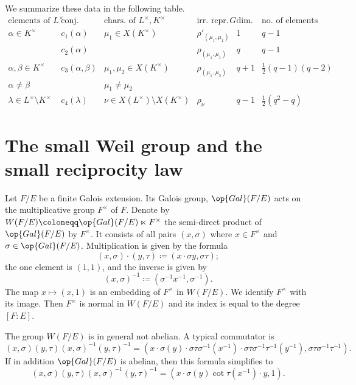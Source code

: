 \documentclass[../main.tex]{subfiles}
\begin{document}
We summarize these data in the following table.
\[\begin{array}{c|c|c|c|c|c}
	\text{elements of }L^\times & \text{conj. classes} & \text{chars. of }L^\times,K^\times & \text{irr. repr. of }G & \text{dim. of repr.} & \text{no. of elements} \\\hline\hline
	\alpha \in K^\times & c_1(\alpha) & \mu_1\in X(K^\times) & \rho'_{(\mu_1,\mu_1)} & 1 & q-1 \\
	& c_2(\alpha) & & \rho_{(\mu_1,\mu_1)} & q  & q-1 \\\hline
	\alpha,\beta\in K^\times & c_3(\alpha,\beta) & \mu_1,\mu_2\in X\left(K^\times\right) & \rho_{(\mu_1,\mu_2)} & q+1 & \frac12(q-1)(q-2) \\
	\alpha\ne\beta & & \mu_1\ne\mu_2 &&& \\\hline
	\lambda\in L^\times\setminus K^\times & c_4(\lambda) & \nu\in X\left(L^\times\right)\setminus X\left(K^\times\right) & \rho_\nu & q-1 & \frac12\left(q^2-q\right)
\end{array}\]

\section{The small Weil group and the small reciprocity law} \label{sec:weil-group}
Let $F/E$ be a finite Galois extension. Its Galois group, $\op{Gal}(F/E)$ acts on the multiplicative group $F^\times$ of $F$. Denote by $W(F/E)\coloneqq\op{Gal}(F/E)\ltimes F^\times$ the semi-direct product of $\op{Gal}(F/E)$ by $F^\times$. It consists of all pairs $(x,\sigma)$ where $x\in F^\times$ and $\sigma\in\op{Gal}(F/E)$. Multiplication is given by the formula
\[(x,\sigma)\cdot(y,\tau)\coloneqq(x\cdot\sigma y,\sigma\tau);\]
the one element is $(1,1)$, and the inverse is given by
\[(x,\sigma)^{-1}\coloneqq\left(\sigma^{-1}x^{-1},\sigma^{-1}\right).\]
The map $x\mapsto(x,1)$ is an embedding of $F^\times$ in $W(F/E)$. We identify $F^\times$ with its image. Then $F^\times$ is normal in $W(F/E)$ and its index is equal to the degree $[F:E]$.

The group $W(F/E)$ is in general not abelian. A typical commutator is
\[(x,\sigma)(y,\tau)(x,\sigma)^{-1}(y,\tau)^{-1}=\left(x\cdot\sigma(y)\cdot\sigma\tau\sigma^{-1}\left(x^{-1}\right)\cdot\sigma\tau\sigma^{-1}\tau^{-1}\left(y^{-1}\right),\sigma\tau\sigma^{-1}\tau^{-1}\right).\]
If in addition $\op{Gal}(F/E)$ is abelian, then this formula simplifies to
\begin{equation}
	(x,\sigma)(y,\tau)(x,\sigma)^{-1}(y,\tau)^{-1}=\left(x\cdot\sigma(y)\cot\tau\left(x^{-1}\right)\cdot y,1\right). \label{eq:weil-commutator}
\end{equation}
\end{document}
